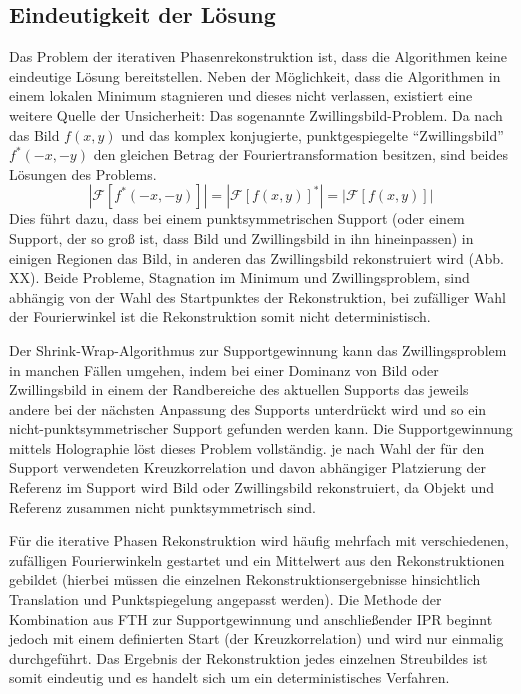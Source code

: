 \subsection{Eindeutigkeit der Lösung}
Das Problem der iterativen Phasenrekonstruktion ist, dass die Algorithmen keine eindeutige Lösung bereitstellen. Neben der Möglichkeit, dass die Algorithmen in einem lokalen Minimum stagnieren und dieses nicht verlassen, existiert eine weitere Quelle der Unsicherheit: Das sogenannte Zwillingsbild-Problem. Da nach  das Bild $f(x,y)$ und das komplex konjugierte, punktgespiegelte "`Zwillingsbild"'  $f^*(-x,-y)$ den gleichen Betrag der Fouriertransformation besitzen, sind beides Lösungen des Problems.
\begin{equation}
	\label{eq:zwilling}
	\left|\mathscr{F}[f^*(-x,-y)]\right|=\left|\mathscr{F}[f(x,y)]^*\right|=\left|\mathscr{F}[f(x,y)]\right|
\end{equation}
Dies führt dazu, dass bei einem punktsymmetrischen Support (oder einem Support, der so groß ist, dass Bild und Zwillingsbild in ihn hineinpassen) in einigen Regionen das Bild, in anderen das Zwillingsbild rekonstruiert wird (Abb. XX). Beide Probleme, Stagnation im Minimum und Zwillingsproblem, sind abhängig von der Wahl des Startpunktes der Rekonstruktion, bei zufälliger Wahl der Fourierwinkel ist die Rekonstruktion somit nicht deterministisch.

Der Shrink-Wrap-Algorithmus zur Supportgewinnung kann das Zwillingsproblem in manchen Fällen umgehen, indem bei einer Dominanz von Bild oder Zwillingsbild in einem der Randbereiche des aktuellen Supports das jeweils andere bei der nächsten Anpassung des Supports unterdrückt wird und so ein nicht-punktsymmetrischer Support gefunden werden kann.
Die Supportgewinnung mittels Holographie löst dieses Problem vollständig. je nach Wahl der für den Support verwendeten Kreuzkorrelation und davon abhängiger Platzierung der Referenz im Support wird Bild oder Zwillingsbild rekonstruiert, da Objekt und Referenz zusammen nicht punktsymmetrisch sind.

Für die iterative Phasen Rekonstruktion wird häufig mehrfach mit verschiedenen, zufälligen Fourierwinkeln gestartet und ein Mittelwert aus den Rekonstruktionen gebildet (hierbei müssen die einzelnen Rekonstruktionsergebnisse hinsichtlich Translation und Punktspiegelung angepasst werden). Die Methode der Kombination aus FTH zur Supportgewinnung und anschließender IPR beginnt jedoch mit einem definierten Start (der Kreuzkorrelation) und wird nur einmalig durchgeführt. Das Ergebnis der Rekonstruktion jedes einzelnen Streubildes ist somit eindeutig und es handelt sich um ein deterministisches Verfahren.

